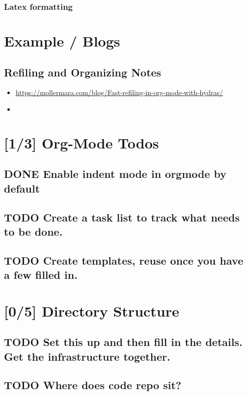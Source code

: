 \documentclass[11pt]{article}
\begin{document}
\subsubsection{Latex formatting}
\label{sec:org5ee0f8c}

\section{Example / Blogs}
\label{sec:org8177f08}
\subsection{Refiling and Organizing Notes}
\label{sec:orgb86d10b}
\begin{itemize}
\item \url{https://mollermara.com/blog/Fast-refiling-in-org-mode-with-hydras/}
\item 
\end{itemize}


\section{[1/3] Org-Mode Todos}
\label{sec:org3ed8bfe}
\subsection{{\bfseries\sffamily DONE} Enable indent mode in orgmode by default}
\label{sec:org75c25eb}
\subsection{{\bfseries\sffamily TODO} Create a task list to track what needs to be done.}
\label{sec:org83602f0}
\subsection{{\bfseries\sffamily TODO} Create templates, reuse once you have a few filled in.}
\label{sec:orgcec521c}


\section{[0/5] Directory Structure}
\label{sec:org7373373}
\subsection{{\bfseries\sffamily TODO} Set this up and then fill in the details. Get the infrastructure together.}
\label{sec:org79900ce}
\subsection{{\bfseries\sffamily TODO} Where does code repo sit?}
\label{sec:orgf133540}
\end{document}
